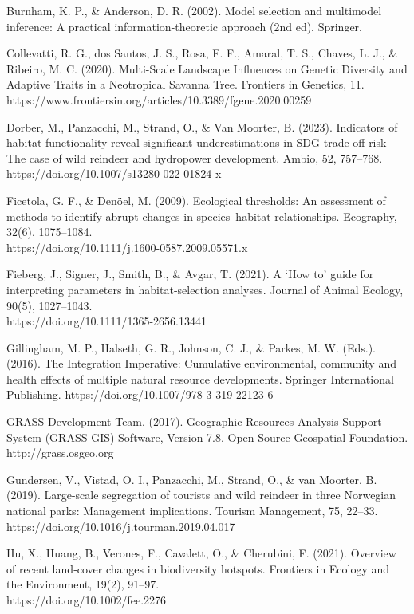 \documentclass[titlepage]{article}
\begin{document}
Burnham, K. P., & Anderson, D. R. (2002). Model selection and multimodel inference: A practical information-theoretic approach (2nd ed). Springer.

Collevatti, R. G., dos Santos, J. S., Rosa, F. F., Amaral, T. S., Chaves, L. J., & Ribeiro, M. C. (2020). Multi-Scale Landscape Influences on Genetic Diversity and Adaptive Traits in a Neotropical Savanna Tree. Frontiers in Genetics, 11. https://www.frontiersin.org/articles/10.3389/fgene.2020.00259

Dorber, M., Panzacchi, M., Strand, O., & Van Moorter, B. (2023). Indicators of habitat functionality reveal significant underestimations in SDG trade-off risk—The case of wild reindeer and hydropower development. Ambio, 52, 757–768. https://doi.org/10.1007/s13280-022-01824-x

Ficetola, G. F., & Denöel, M. (2009). Ecological thresholds: An assessment of methods to identify abrupt changes in species–habitat relationships. Ecography, 32(6), 1075–1084.\\ https://doi.org/10.1111/j.1600-0587.2009.05571.x

Fieberg, J., Signer, J., Smith, B., & Avgar, T. (2021). A ‘How to’ guide for interpreting parameters in habitat‐selection analyses. Journal of Animal Ecology, 90(5), 1027–1043.\\ https://doi.org/10.1111/1365-2656.13441

Gillingham, M. P., Halseth, G. R., Johnson, C. J., & Parkes, M. W. (Eds.). (2016). The Integration Imperative: Cumulative environmental, community and health effects of multiple natural resource developments. Springer International Publishing. https://doi.org/10.1007/978-3-319-22123-6

GRASS Development Team. (2017). Geographic Resources Analysis Support System (GRASS GIS) Software, Version 7.8. Open Source Geospatial Foundation. http://grass.osgeo.org

Gundersen, V., Vistad, O. I., Panzacchi, M., Strand, O., & van Moorter, B. (2019). Large-scale segregation of tourists and wild reindeer in three Norwegian national parks: Management implications. Tourism Management, 75, 22–33. https://doi.org/10.1016/j.tourman.2019.04.017

Hu, X., Huang, B., Verones, F., Cavalett, O., & Cherubini, F. (2021). Overview of recent land‐cover changes in biodiversity hotspots. Frontiers in Ecology and the Environment, 19(2), 91–97. \\ https://doi.org/10.1002/fee.2276
\end{document}

